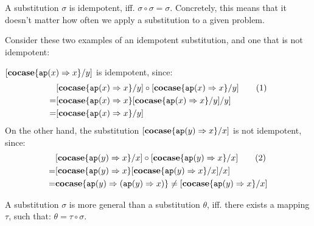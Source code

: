 \documentclass[twoside,12pt,a4paper]{article}
\begin{document}
\begin{definition}[Idempotency]
    A substitution $\sigma$ is idempotent, iff. $\sigma \circ \sigma = \sigma$.
    Concretely, this means that it doesn't matter how often we apply a substitution to a given problem.
\end{definition}

Consider these two examples of an idempotent substitution, and one that is not idempotent:
\begin{example}[Idempotency]
    $[\textbf{cocase}\{\texttt{ap}(x)\Rightarrow x\} / y]$ is idempotent, since:
    \begin{align*}
        &[\textbf{cocase}\{\texttt{ap}(x)\Rightarrow x\} / y] \circ [\textbf{cocase}\{\texttt{ap}(x)\Rightarrow x\} / y] \tag{1}\\
        =& [\textbf{cocase}\{\texttt{ap}(x)\Rightarrow x\}[\textbf{cocase}\{\texttt{ap}(x)\Rightarrow x\} / y] / y] \\
        =& [\textbf{cocase}\{\texttt{ap}(x)\Rightarrow x\} / y] 
    \end{align*}
On the other hand, the substitution $[\textbf{cocase}\{\texttt{ap}(y)\Rightarrow x\} / x]$ is not idempotent, since:
\begin{align*}
    &[\textbf{cocase}\{\texttt{ap}(y)\Rightarrow x\} / x] \circ [\textbf{cocase}\{\texttt{ap}(y)\Rightarrow x\} / x]\tag{2}\\ 
    =& [\textbf{cocase}\{\texttt{ap}(y)\Rightarrow x\}[\textbf{cocase}\{\texttt{ap}(y)\Rightarrow x\} / x] / x] \\
    =& \textbf{cocase}\{\texttt{ap}(y)\Rightarrow (\texttt{ap}(y)\Rightarrow x) \} \neq [\textbf{cocase}\{\texttt{ap}(y)\Rightarrow x\} / x]
\end{align*}

\end{example}

\begin{definition} 
    A substitution $\sigma$ is more general than a substitution $\theta$, iff. there exists a mapping $\tau$, such that: $\theta = \tau \circ \sigma$.
\end{definition}
\end{document}
